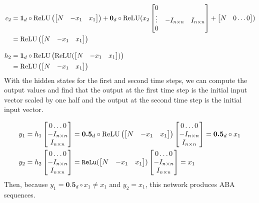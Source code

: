 \begin{align*}
  c_2 &= \textbf{1}_d \circ \operatorname{ReLU} \left( \begin{bmatrix} N & -x_1 & x_1 \end{bmatrix}\right) + \textbf{0}_d\circ \operatorname{ReLU}(x_2\begin{bmatrix} 0 &  & \\ \vdots & -I_{n \times n} & I_{n \times n}\\ 0 & &  \end{bmatrix} + \begin{bmatrix} N & 0 \dots 0\end{bmatrix}) \\
      &= \operatorname{ReLU} \left( \begin{bmatrix} N & -x_1 & x_1 \end{bmatrix}\right) \\[2ex]
  h_2 &= \textbf{1}_d \circ \operatorname{ReLU}\left(\operatorname{ReLU} ( \begin{bmatrix} N & -x_1 & x_1 \end{bmatrix})\right) \\
      &= \operatorname{ReLU} \left( \begin{bmatrix} N & -x_1 & x_1 \end{bmatrix}\right)
\end{align*}
%
With the hidden states for the first and second time steps, we can compute the output values and find that the output at the first time step is the initial input vector scaled by one half and the output at the second time step is the initial input vector.

\begin{align*}
  y_1 &= h_1\begin{bmatrix} 0 \dots 0 \\ -I_{n \times n} \\ I_{n \times n}  \end{bmatrix} = \textbf{0.5}_d\circ \operatorname{ReLU}\left( \begin{bmatrix} N & -x_1 & x_1 \end{bmatrix}\right) \begin{bmatrix} 0 \dots 0 \\ -I_{n \times n} \\ I_{n \times n}  \end{bmatrix} = \textbf{0.5}_d\circ x_1\\
  y_2 &= h_2\begin{bmatrix} 0 \dots 0 \\ -I_{n \times n} \\ I_{n \times n}  \end{bmatrix} = \texttt{ReLu} ( \begin{bmatrix} N & -x_1 & x_1 \end{bmatrix}) \begin{bmatrix} 0 \dots 0 \\ -I_{n \times n} \\ I_{n \times n}  \end{bmatrix} = x_1
\end{align*}
%
Then, because $y_1 = \textbf{0.5}_d\circ x_1 \not = x_1$ and $y_2 = x_1$, this network produces ABA sequences.



